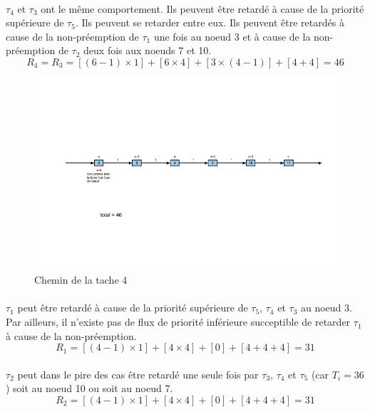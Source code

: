 \documentclass[10pt,a4paper]{article}
\newenvironment{figureH} {%
\begin{figure}[H]
}{%
\end{figure}
}
\begin{document}
\paragraph{}
$\tau_4$ et $\tau_3$ ont le même comportement. Ils peuvent être retardé à cause de la priorité supérieure de $\tau_5$. Ils peuvent se retarder entre eux. Ils peuvent être retardés à cause de la non-préemption de $\tau_1$ une fois au noeud 3 et à cause de la non-préemption de $\tau_2$ deux fois aux noeuds 7 et 10.
\[ R_{4} = R_3 = [(6-1) \times 1] +[ 6 \times 4] +[ 3 \times (4-1) ]+[ 4 + 4] = 46 \]

\begin{figureH}
  \includegraphics[width=\textwidth]{images/tache4.png}
  \center
  \caption{Chemin de la tache 4}
        \label{image_global}
\end{figureH}

\paragraph{}
$\tau_1$ peut être retardé à cause de la priorité supérieure de $\tau_5$, $\tau_4$ et $\tau_3$ au noeud 3. Par ailleurs, il n'existe pas de flux de priorité inférieure succeptible de retarder $\tau_1$ à cause de la non-préemption.
\[ R_1 = [(4-1)\times 1 ]+[ 4 \times 4] +[ 0] +[ 4 +4 +4] = 31 \]

\paragraph{}
$\tau_2$ peut dans le pire des cas être retardé une seule fois par $\tau_3$, $\tau_4$ et $\tau_5$ (car $T_i = 36$) soit au noeud 10 ou soit au noeud 7.
\[ R_2 = [(4-1) \times 1 ] + [4 \times 4 ] + [0] + [4+4+4] = 31\]


    
\end{document}
